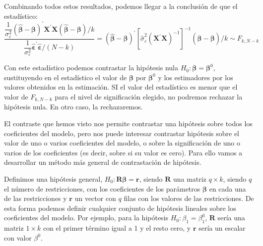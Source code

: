 Combinando todos estos resultados, podemos llegar a la conclusi\'on
de que el estad\'istico:
\begin{equation*}
\dfrac{\dfrac{1}{\sigma_{\varepsilon}^{2}}\left(\hat{\boldsymbol{\beta}}-\boldsymbol{\beta}\right)^{\prime}\boldsymbol{X}^{\prime}\boldsymbol{X}\left(\hat{\boldsymbol{\beta}}-\boldsymbol{\beta}\right)/k}{\dfrac{1}{\sigma_{\varepsilon}^{2}}\hat{\boldsymbol{\varepsilon}}^{\prime}\hat{\boldsymbol{\varepsilon}}/\left(N-k\right)}=\left(\hat{\boldsymbol{\beta}}-\boldsymbol{\beta}\right)^{\prime}\left[\hat{\sigma}_{\varepsilon}^{2}\left(\boldsymbol{X}^{\prime}\boldsymbol{X}\right)^{-1}\right]^{-1}\left(\hat{\boldsymbol{\beta}}-\boldsymbol{\beta}\right)/k\sim F_{k,N-k}
\end{equation*}


Con este estad\'istico podemos contrastar la hip\'otesis nula $H_{0}:\boldsymbol{\beta}=\boldsymbol{\beta}^{0}$,
sustituyendo en el estad\'istico el valor de $\boldsymbol{\beta}$ por
$\boldsymbol{\beta}^{0}$ y los estimadores por los valores obtenidos
en la estimaci\'on. SI el valor del estad\'istico es menor que el valor
de $F_{k,N-k}$ para el nivel de significaci\'on elegido, no podremos
rechazar la hip\'otesis nula. En otro caso, la rechazaremos.


El contraste que hemos visto nos permite contrastar una hip\'otesis sobre todos
los coeficientes del modelo, pero nos puede interesar contrastar hip\'otesis
sobre el valor de uno o varios coeficientes del modelo, o sobre la
significaci\'on de uno o varios de los coeficientes (es decir, sobre
si su valor es cero). Para ello vamos a desarrollar un m\'etodo m\'as
general de contrastaci\'on de hip\'otesis.

Definimos una hip\'otesis general, $H_{0}:\boldsymbol{R}\boldsymbol{\beta}=\boldsymbol{r}$,
siendo $\boldsymbol{R}$ una matriz $q\times k$, siendo $q$ el n\'umero
de restricciones, con los coeficientes de los par\'ametros $\boldsymbol{\beta}$
en cada una de las restricciones y $\boldsymbol{r}$ un vector con
$q$ filas con los valores de las restricciones. De esta forma podemos
definir cualquier conjunto de hip\'otesis lineales sobre los coeficientes
del modelo. Por ejemplo, para la hip\'otesis $H_{0}:\beta_{1}=\beta_{1}^{0}$,
$\boldsymbol{R}$ ser\'ia una matriz $1\times k$ con el primer t\'ermino
igual a 1 y el resto cero, y $\boldsymbol{r}$ ser\'ia un escalar con
valor $\beta^{0}$.

